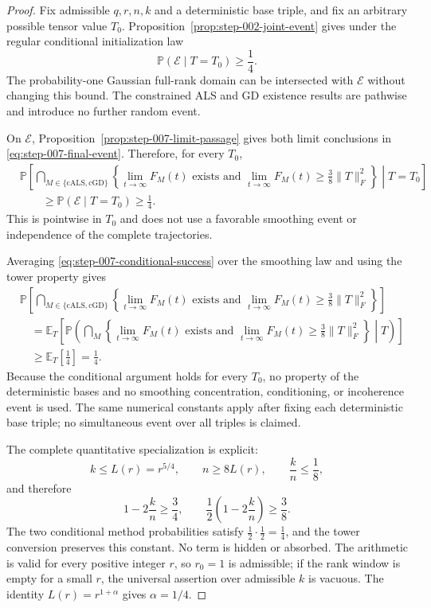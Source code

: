 \begin{proof}
Fix admissible $q,r,n,k$ and a deterministic base triple, and fix an arbitrary
possible tensor value $T_0$.  Proposition~\ref{prop:step-002-joint-event}
gives under the regular conditional initialization law
\[
 \mathbb P(\mathcal E\mid T=T_0)\ge\frac14.
 \tag{A.20}\label{eq:step-007-conditional-event}
\]
The probability-one Gaussian full-rank domain can be intersected with
$\mathcal E$ without changing this bound.  The constrained ALS and GD
existence results are pathwise and introduce no further random event.

On $\mathcal E$, Proposition~\ref{prop:step-007-limit-passage} gives both
limit conclusions in \eqref{eq:step-007-final-event}.  Therefore, for every
$T_0$,
\[
 \begin{aligned}
 &\mathbb P\!\left[
 \bigcap_{M\in\{\mathrm{cALS},\mathrm{cGD}\}}
 \left\{
 \lim_{t\to\infty}F_M(t)\text{ exists and }
 \lim_{t\to\infty}F_M(t)\ge\frac38\|T\|_F^2
 \right\}
 \middle|T=T_0\right]\\
 &\qquad\ge\mathbb P(\mathcal E\mid T=T_0)\ge\frac14.
 \end{aligned}
 \tag{A.21}\label{eq:step-007-conditional-success}
\]
This is pointwise in $T_0$ and does not use a favorable smoothing event or
independence of the complete trajectories.

Averaging \eqref{eq:step-007-conditional-success} over the smoothing law and
using the tower property gives
\[
 \begin{aligned}
 &\mathbb P\!\left[
 \bigcap_{M\in\{\mathrm{cALS},\mathrm{cGD}\}}
 \left\{
 \lim_{t\to\infty}F_M(t)\text{ exists and }
 \lim_{t\to\infty}F_M(t)\ge\frac38\|T\|_F^2
 \right\}\right]\\
 &\quad=\mathbb E_T\!\left[
 \mathbb P\!\left(
 \bigcap_M\left\{
 \lim_{t\to\infty}F_M(t)\text{ exists and }
 \lim_{t\to\infty}F_M(t)\ge\frac38\|T\|_F^2
 \right\}\middle|T\right)\right]\\
 &\quad\ge\mathbb E_T\!\left[\frac14\right]=\frac14.
 \end{aligned}
\]
Because the conditional argument holds for every $T_0$, no property of the
deterministic bases and no smoothing concentration, conditioning, or
incoherence event is used.  The same numerical constants apply after fixing
each deterministic base triple; no simultaneous event over all triples is
claimed.

The complete quantitative specialization is explicit:
\[
 k\le L(r)=r^{5/4},
 \qquad n\ge8L(r),
 \qquad \frac{k}{n}\le\frac18,
\]
and therefore
\[
 1-2\frac{k}{n}\ge\frac34,
 \qquad
 \frac12\left(1-2\frac{k}{n}\right)\ge\frac38.
\]
The two conditional method probabilities satisfy
$\frac12\cdot\frac12=\frac14$, and the tower conversion preserves this
constant.  No term is hidden or absorbed.  The arithmetic is valid for every
positive integer $r$, so $r_0=1$ is admissible; if the rank window is empty
for a small $r$, the universal assertion over admissible $k$ is vacuous.
The identity $L(r)=r^{1+\alpha}$ gives $\alpha=1/4$.


\end{proof}
